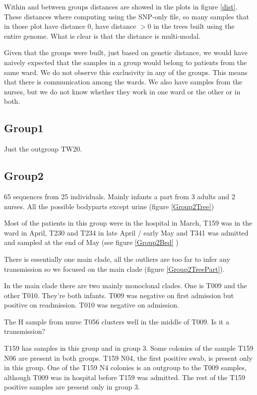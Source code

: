 \documentclass[12pt,a4paper]{article}
\begin{document}
Within and between groups distances are showed in the plots in figure \ref{dist}. These distances where computing using the SNP-only file, so many samples that in those plot have distance 0, have distance $>0$ in the trees built using the entire genome. What is clear is that the distance is multi-modal. 

Given that the groups were built, just based on genetic distance, we would have naively expected that the samples in a group would belong to patients from the same ward. We do not observe this exclusivity in any of the groups. This means that there is communication among the wards. We also have samples from the nurses, but we do not know whether they work in one ward or the other or in both.
 

\subsection{Group1}
Just the outgroup TW20.
\subsection{Group2}
65 sequences from 25 individuals. Mainly infants a part from 3 adults and 2 nurses. All the possible bodyparts except urine (figure \ref{Group2Tree})

Most of the patients in this group were in the hospital in March, T159  was in the ward in April, T230 and T234 in late April / early May and T341 was admitted and sampled at the end of May (see figure \ref{Group2Bed} )

There is essentially one main clade, all the outliers are too far to infer any transmission so we focused on the main clade (figure \ref{Group2TreePart}). 


In the main clade there are two mainly monoclonal clades. One is T009 and the other T010. They're both infants. T009 was negative on first admission but positive on readmission. T010 was negative on admission.

The H sample from nurse T056 clusters well in the middle of T009. Is it a transmission?

T159 has samples in this group and in group 3. Some colonies of the sample T159 N06 are present in both groups. T159 N04, the first positive swab, is present only in this group. One of the T159 N4 colonies is an outgroup to the T009 samples, although T009 was in hospital before T159 was admitted. The rest of the T159 positive samples are present only in group 3. 
\end{document}
